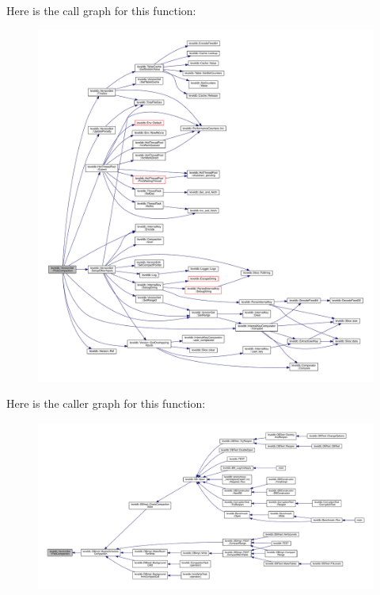 Here is the call graph for this function\+:\nopagebreak
\begin{figure}[H]
\begin{center}
\leavevmode
\includegraphics[width=350pt]{classleveldb_1_1_version_set_ad3d3fd4a31d8614fef40d144846513ce_cgraph}
\end{center}
\end{figure}




Here is the caller graph for this function\+:
\nopagebreak
\begin{figure}[H]
\begin{center}
\leavevmode
\includegraphics[width=350pt]{classleveldb_1_1_version_set_ad3d3fd4a31d8614fef40d144846513ce_icgraph}
\end{center}
\end{figure}



